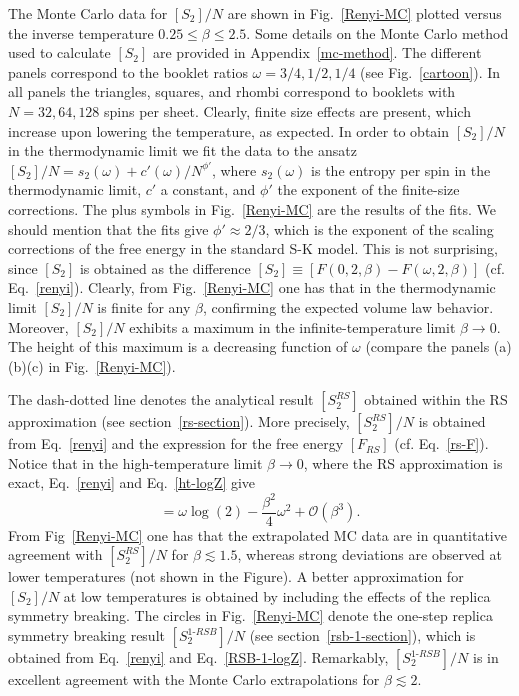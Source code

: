 \documentclass[twocolumn,superscriptaddress,prb,10pt]{revtex4-1}
\begin{document}
The Monte Carlo data for $[S_2]/N$  are shown in Fig.~\ref{Renyi-MC} plotted versus the 
inverse temperature $0.25\le\beta\le 2.5$. Some details on the Monte Carlo method used 
to calculate $[S_2]$ are provided in Appendix~\ref{mc-method}. The different panels 
correspond to the booklet ratios $\omega=3/4,1/2,1/4$ (see Fig.~\ref{cartoon}). In all panels the 
triangles, squares, and rhombi correspond to booklets with $N=32,64,128$ spins per sheet. 
Clearly, finite size effects are present, which increase upon lowering 
the temperature, as expected. In order to obtain $[S_2]/N$ in the thermodynamic limit 
we fit the data to the ansatz $[S_2]/N=s_2(\omega)+c'(\omega)/N^{\phi'}$, where 
$s_2(\omega)$ is the entropy per spin in the thermodynamic limit, $c'$ a constant, and 
$\phi'$ the exponent of the finite-size corrections. The plus symbols in Fig.~\ref{Renyi-MC} 
are the results of the fits. We should mention that the fits give $\phi'\approx 2/3$, 
which is the exponent of the scaling corrections of the free energy in the standard 
S-K model. This is not surprising, since $[S_2]$ is obtained as the difference 
$[S_2]\equiv [F(0,2,\beta)-F(\omega,2,\beta)]$ (cf. Eq.~\eqref{renyi}). 
Clearly, from Fig.~\ref{Renyi-MC} one has that in the thermodynamic limit $[S_2]/N$ is 
finite for any $\beta$, confirming the expected volume law behavior. Moreover, $[S_2]/N$ 
exhibits a maximum in the infinite-temperature limit $\beta\to0$. The height of this 
maximum  is a decreasing function of $\omega$ (compare the panels (a)(b)(c) in 
Fig.~\ref{Renyi-MC}). 

The dash-dotted line denotes the analytical result $[S_2^{RS}]$ obtained within the RS 
approximation (see section~\ref{rs-section}). More precisely, $[S_2^{RS}]/N$ is obtained 
from Eq.~\eqref{renyi} and the expression for the free energy $[F_{RS}]$ (cf. Eq.~\eqref{rs-F}). 
Notice that in the high-temperature limit $\beta\to0$, where the RS approximation is exact, 
Eq.~\eqref{renyi} and Eq.~\eqref{ht-logZ} give 
%
\begin{equation}
[S^{RS}_2]=\omega\log(2)-\frac{\beta^2}{4}\omega^2+{\mathcal O}(\beta^3).
\end{equation}
%
From Fig~\ref{Renyi-MC} one has that the extrapolated MC data are in quantitative 
agreement with $[S_2^{RS}]/N$ for $\beta\lesssim 1.5$, whereas strong deviations are 
observed at lower temperatures (not shown in the Figure). A better approximation for 
$[S_2]/N$ at low temperatures is obtained by including the effects of the replica 
symmetry breaking. The circles in Fig.~\ref{Renyi-MC} denote the one-step replica 
symmetry breaking result $[S_2^{1\textrm{-}RSB}]/N$ (see section~\ref{rsb-1-section}), 
which is obtained from Eq.~\eqref{renyi}  and Eq.~\eqref{RSB-1-logZ}. Remarkably, 
$[S_2^{1\textrm{-}RSB}]/N$ is in excellent agreement with the Monte Carlo extrapolations 
for $\beta\lesssim 2$. 
\end{document}
